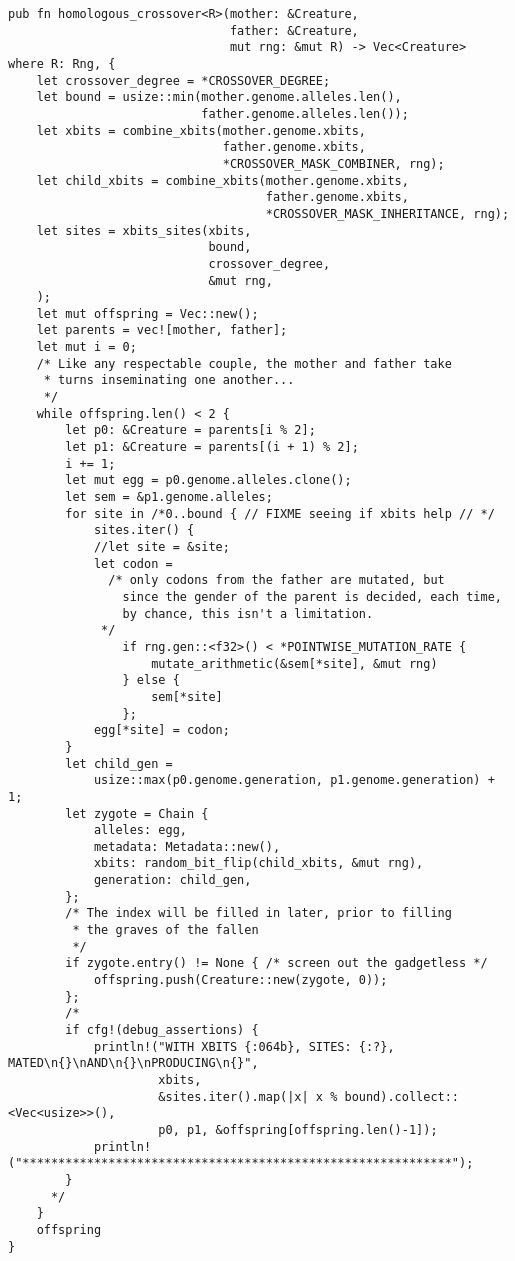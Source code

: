 \documentclass[11pt]{article}
\begin{document}
\lstset{language=rust,label=orga1e70f9,caption= ,captionpos=b,numbers=none}
\begin{lstlisting}
pub fn homologous_crossover<R>(mother: &Creature,
                               father: &Creature,
                               mut rng: &mut R) -> Vec<Creature>
where R: Rng, {
    let crossover_degree = *CROSSOVER_DEGREE;
    let bound = usize::min(mother.genome.alleles.len(), 
                           father.genome.alleles.len());
    let xbits = combine_xbits(mother.genome.xbits, 
                              father.genome.xbits, 
                              *CROSSOVER_MASK_COMBINER, rng);
    let child_xbits = combine_xbits(mother.genome.xbits, 
                                    father.genome.xbits, 
                                    *CROSSOVER_MASK_INHERITANCE, rng);
    let sites = xbits_sites(xbits,
                            bound, 
                            crossover_degree, 
                            &mut rng,
    );
    let mut offspring = Vec::new();
    let parents = vec![mother, father];
    let mut i = 0;
    /* Like any respectable couple, the mother and father take
     * turns inseminating one another...
     */
    while offspring.len() < 2 {
        let p0: &Creature = parents[i % 2];
        let p1: &Creature = parents[(i + 1) % 2];
        i += 1;
        let mut egg = p0.genome.alleles.clone();
        let sem = &p1.genome.alleles;
        for site in /*0..bound { // FIXME seeing if xbits help // */
            sites.iter() {
            //let site = &site;
            let codon =
              /* only codons from the father are mutated, but
                since the gender of the parent is decided, each time,
                by chance, this isn't a limitation.
             */
                if rng.gen::<f32>() < *POINTWISE_MUTATION_RATE {
                    mutate_arithmetic(&sem[*site], &mut rng)
                } else {
                    sem[*site]
                };
            egg[*site] = codon;
        }
        let child_gen =
            usize::max(p0.genome.generation, p1.genome.generation) + 1;
        let zygote = Chain {
            alleles: egg,
            metadata: Metadata::new(),
            xbits: random_bit_flip(child_xbits, &mut rng),
            generation: child_gen,
        };
        /* The index will be filled in later, prior to filling
         * the graves of the fallen
         */
        if zygote.entry() != None { /* screen out the gadgetless */
            offspring.push(Creature::new(zygote, 0));
        };
        /*
        if cfg!(debug_assertions) {
            println!("WITH XBITS {:064b}, SITES: {:?}, MATED\n{}\nAND\n{}\nPRODUCING\n{}",
                     xbits,
                     &sites.iter().map(|x| x % bound).collect::<Vec<usize>>(),
                     p0, p1, &offspring[offspring.len()-1]);
            println!("************************************************************");
        }
      */
    }
    offspring
}
\end{lstlisting}
\end{document}
